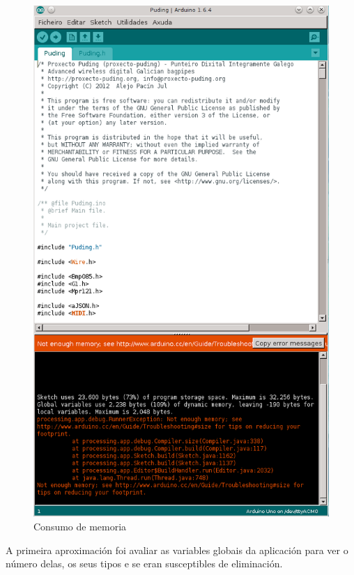    \begin{figure}[htbp]
    \centering
    \includegraphics[scale=0.6,keepaspectratio=true]{./imagenes/consumo-memoria.png}
    \caption{Consumo de memoria}
    \label{figura:ConsumoMemoria}
   \end{figure}
   
   A primeira aproximación foi avaliar as variables globais da aplicación para
   ver o número delas, os seus tipos e se eran susceptibles de eliminación. \\
   
